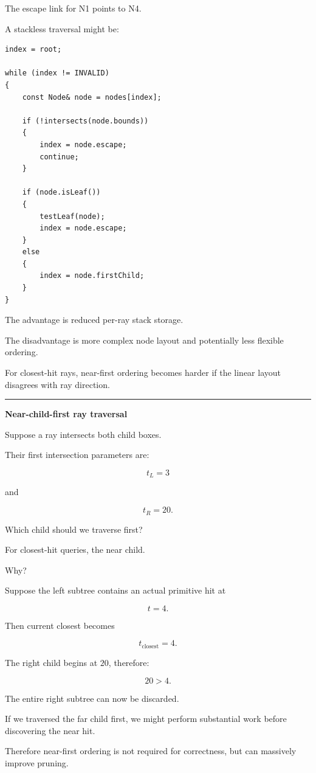 The escape link for N1 points to N4.

A stackless traversal might be:

\begin{verbatim}
index = root;

while (index != INVALID)
{
    const Node& node = nodes[index];

    if (!intersects(node.bounds))
    {
        index = node.escape;
        continue;
    }

    if (node.isLeaf())
    {
        testLeaf(node);
        index = node.escape;
    }
    else
    {
        index = node.firstChild;
    }
}
\end{verbatim}

The advantage is reduced per-ray stack storage.

The disadvantage is more complex node layout and potentially less flexible ordering.

For closest-hit rays, near-first ordering becomes harder if the linear layout disagrees with ray direction.

\begin{center}\rule{0.5\linewidth}{0.5pt}\end{center}

\textbf{Near-child-first ray traversal}

Suppose a ray intersects both child boxes.

Their first intersection parameters are:

\[
t_L=3
\]

and

\[
t_R=20.
\]

Which child should we traverse first?

For closest-hit queries, the near child.

Why?

Suppose the left subtree contains an actual primitive hit at

\[
t=4.
\]

Then current closest becomes

\[
t_{\text{closest}}=4.
\]

The right child begins at \(20\), therefore:

\[
20>4.
\]

The entire right subtree can now be discarded.

If we traversed the far child first, we might perform substantial work before discovering the near hit.

Therefore near-first ordering is not required for correctness, but can massively improve pruning.

